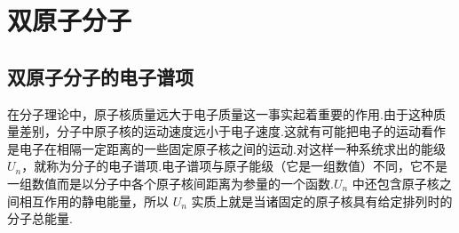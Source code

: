 %
%
\chapter{双原子分子}

\section{双原子分子的电子谱项}

在分子理论中，原子核质量远大于电子质量这一事实起着重要的作用.由于这种质量差别，分子中原子核的运动速度远小于电子速度.这就有可能把电子的运动看作是电子在相隔一定距离的一些固定原子核之间的运动.对这样一种系统求出的能级 $U_n$，就称为分子的电子谱项.电子谱项与原子能级（它是一组数值）不同，它不是一组数值而是以分子中各个原子核间距离为参量的一个函数.$U_n$ 中还包含原子核之间相互作用的静电能量，所以 $U_n$ 实质上就是当诸固定的原子核具有给定排列时的分子总能量.

